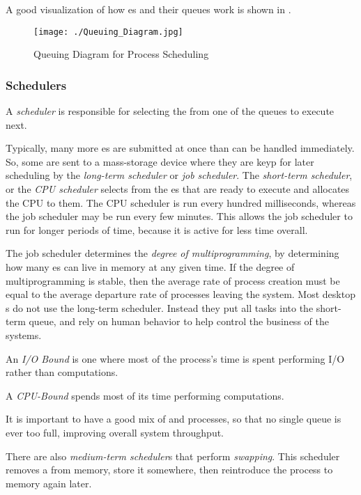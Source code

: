 A good visualization of how es and their queues work is shown in .

\begin{figure}[h!tbp]
  \centering
  \texttt{[image: ./Queuing\_Diagram.jpg]}
  \caption{Queuing Diagram for Process Scheduling}
  \label{fig:Queuing_Diagram}
\end{figure}

\subsubsection{Schedulers}\label{subsubsec:Schedulers}
\begin{definition}[Scheduler]\label{def:Scheduler}
  A \emph{scheduler} is responsible for selecting the  from one of the queues to execute next.
\end{definition}

Typically, many more es are submitted at once than can be handled immediately.
So, some are sent to a mass-storage device where they are keyp for later scheduling by the \emph{long-term scheduler} or \emph{job scheduler}.
The \emph{short-term scheduler}, or the \emph{CPU scheduler} selects from the es that are ready to execute and allocates the CPU to them.
The CPU scheduler is run every hundred milliseconds, whereas the job scheduler may be run every few minutes.
This allows the job scheduler to run for longer periods of time, because it is active for less time overall.

The job scheduler determines the \emph{degree of multiprogramming}, by determining how many es can live in memory at any given time.
If the degree of multiprogramming is stable, then the average rate of process creation must be equal to the average departure rate of processes leaving the system.
Most desktop s do not use the long-term scheduler.
Instead they put all tasks into the short-term queue, and rely on human behavior to help control the business of the systems.

\begin{definition}[I/O Bound]\label{def:IO_Bound}
  An \emph{I/O Bound}  is one where most of the process's time is spent performing I/O rather than computations.
\end{definition}

\begin{definition}\label{def:CPU_Bound}
  A \emph{CPU-Bound}  spends most of its time performing computations.
\end{definition}

It is important to have a good mix of  and  processes, so that no single queue is ever too full, improving overall system throughput.

There are also \emph{medium-term scheduler}s that perform \emph{swapping}.
This scheduler removes a  from memory, store it somewhere, then reintroduce the process to memory again later.

